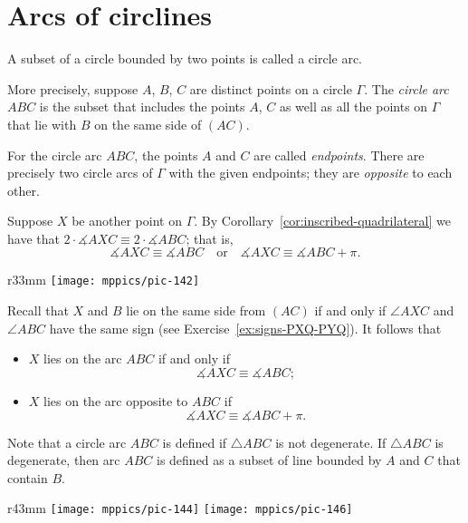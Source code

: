 \section*{Arcs of circlines}

A subset of a circle bounded by two points is called a circle arc.

More precisely,
suppose $A$, $B$, $C$ are distinct points on a circle $\Gamma$.
The \emph{circle arc}~$ABC$ is the subset that includes the points $A$, $C$
as well as all the points on $\Gamma$ that lie with $B$ on the same side of $(AC)$.

For the circle arc $ABC$, 
the points $A$ and $C$ are called 
\emph{endpoints}. 
There are precisely two circle arcs of $\Gamma$ with the given endpoints; they are \emph{opposite} to each other.

Suppose $X$ be another point on $\Gamma$.
By Corollary~\ref{cor:inscribed-quadrilateral} we have
that $2\cdot\measuredangle AXC\equiv 2\cdot\measuredangle ABC$;
that is,
\[\measuredangle AXC\equiv\measuredangle ABC
\quad\text{or}\quad
\measuredangle AXC\equiv\measuredangle ABC+\pi.\]

\begin{wrapfigure}{r}{33mm}
\vskip-2mm
\centering
\texttt{[image: mppics/pic-142]}
\end{wrapfigure}

Recall that $X$ and $B$ lie on the same side from $(AC)$ if and only if $\angle AXC$ and $\angle ABC$ have the same sign (see Exercise~\ref{ex:signs-PXQ-PYQ}).
It follows that 
\begin{itemize}
\item $X$ lies on the arc $ABC$ if and only if 
\[\measuredangle AXC\equiv\measuredangle ABC;\]
\item $X$ lies on the arc opposite to $ABC$ if 
\[\measuredangle AXC\equiv\measuredangle ABC+\pi.\]
\end{itemize}

Note that a circle arc $ABC$ is defined if $\triangle ABC$ is not degenerate.
If $\triangle ABC$ is degenerate, then arc $ABC$ is defined as a subset of line bounded by $A$ and $C$ that contain $B$.


\begin{wrapfigure}{r}{43mm}
\vskip-2mm
\centering
\texttt{[image: mppics/pic-144]}
\vskip4mm
\texttt{[image: mppics/pic-146]}
\end{wrapfigure}

